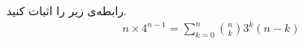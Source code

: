 \p
رابطه‌ی زیر را اثبات کنید.
        \begin{align*}
       n\times 4^{n-1} = \sum\limits_{k=0}^{n} \binom{n}{k}3^k (n-k) 
        \end{align*}
